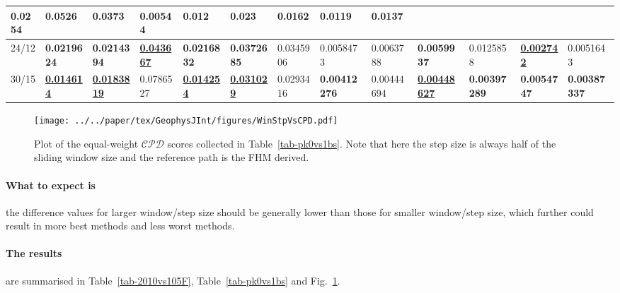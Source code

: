\begin{landscape}
\begin{table*}
{\begin{tabular}{|l|l|l|l|l|l|l|l|l|l|l|l|l|}
  0.0254 & 0.0526 & 0.0373 & 0.00544 & 0.012 &
  0.023 & 0.0162 & {\color[HTML]{34FF34} \textbf{0.0119}} & 0.0137 \\ \hline
24/12 & {\color[HTML]{32CB00} \textbf{0.0219624}} & {\color[HTML]{32CB00}
  \textbf{0.0214394}} & {\color[HTML]{009901} {\ul\textbf{0.043667}}} &
  {\color[HTML]{32CB00} \textbf{0.0216832}} & {\color[HTML]{32CB00}
  \textbf{0.0372685}} & 0.0345906 & 0.0058473 & 0.0063788 &
  {\color[HTML]{32CB00} \textbf{0.0059937}} & 0.0125858 &
  {\color[HTML]{009901} {\ul\textbf{0.002742}}} & 0.0051643 \\ \hline
30/15 & {\color[HTML]{009901} {\ul\textbf{0.014614}}} & {\color[HTML]{009901}
  {\ul\textbf{0.0183819}}} & 0.0786527 & {\color[HTML]{009901} {\ul\textbf{0.014254}}} & {\color[HTML]{009901} {\ul\textbf{0.031029}}} &
  0.0293416 & {\color[HTML]{34FF34} \textbf{0.00412276}} &
  0.00444694 & {\color[HTML]{009901} {\ul\textbf{0.00448627}}} & {\color[HTML]{32CB00} \textbf{0.00397289}} &
  {\color[HTML]{32CB00} \textbf{0.0054747}} & {\color[HTML]{32CB00}
  \textbf{0.00387337}} \\ \hline
\end{tabular}%
}
\end{table*}
\end{landscape}

\begin{figure}
\centering
\texttt{[image: ../../paper/tex/GeophysJInt/figures/WinStpVsCPD.pdf]}
\caption[Sliding window and step sizes vs $\mathcal{CPD}$]{Plot of the
equal-weight $\mathcal{CPD}$ scores collected in Table~\ref{tab-pk0vs1bs}. Note
that here the step size is always half of the sliding window size and the
reference path is the FHM derived.}\label{fig-WinStpVsCPD}
\end{figure}

\paragraph{What to expect is}
the difference values for larger window/step size should be generally lower than
those for smaller window/step size, which further could result in more best
methods and less worst methods.

\paragraph{The results}
are summarised in Table~\ref{tab-2010vs105F}, Table~\ref{tab-pk0vs1bs} and
Fig.~\ref{fig-WinStpVsCPD}.


